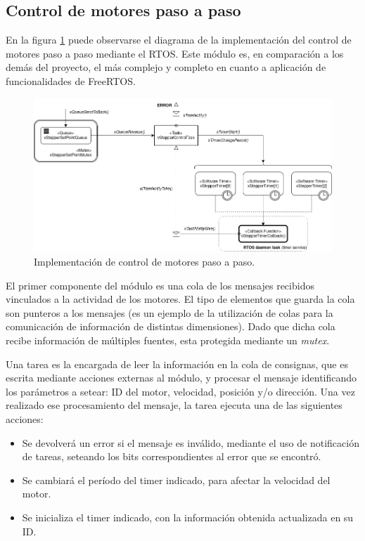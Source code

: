 \documentclass{IEEEtran}
\begin{document}
\subsection{Control de motores paso a paso}
\label{sec:stepper}

En la figura \ref{fig:diagrama-stepper} puede observarse el diagrama de la implementación del control de motores paso a paso mediante el RTOS. Este módulo es, en comparación a los demás del proyecto, el más complejo y completo en cuanto a aplicación de funcionalidades de FreeRTOS.

\begin{figure}[ht]
    \centering
    \includegraphics[scale=0.5]{../diagrama_stepper.png}
    \caption{Implementación de control de motores paso a paso.}
    \label{fig:diagrama-stepper}
\end{figure}

El primer componente del módulo es una cola de los mensajes recibidos vinculados a la actividad de los motores. El tipo de elementos que guarda la cola son punteros a los mensajes (es un ejemplo de la utilización de colas para la comunicación de información de distintas dimensiones). Dado que dicha cola recibe información de múltiples fuentes, esta protegida mediante un \textit{mutex}.

Una tarea es la encargada de leer la información en la cola de consignas, que es escrita mediante acciones externas al módulo, y procesar el mensaje identificando los parámetros a setear: ID del motor, velocidad, posición y/o dirección. Una vez realizado ese procesamiento del mensaje, la tarea ejecuta una de las siguientes acciones:

\begin{itemize}
    \item Se devolverá un error si el mensaje es inválido, mediante el uso de notificación de tareas, seteando los bits correspondientes al error que se encontró.
    \item Se cambiará el período del timer indicado, para afectar la velocidad del motor.
    \item Se inicializa el timer indicado, con la información obtenida actualizada en su ID.
\end{itemize}
\end{document}
